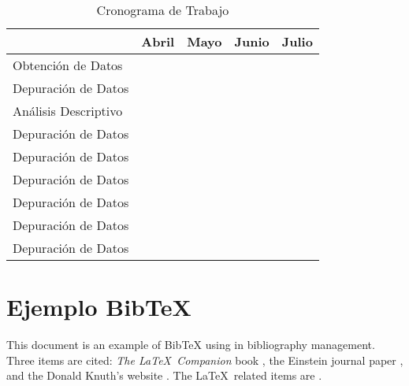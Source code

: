 \documentclass[10pt,a5paper]{article}
\begin{document}
\begin{table}[h!]
\centering
\caption{Cronograma de Trabajo}
\label{cronograma}
\begin{tabular}{|l|c|c|c|c|}
\hline
                     & Abril   & Mayo   & Junio   & Julio  \\ \hline
Obtención de Datos   &   &   &   &    \\ \hline
Depuración de Datos  &   &   &   &    \\ \hline
Análisis Descriptivo &   &   &   &    \\ \hline
Depuración de Datos  &   &   &   &    \\ \hline
Depuración de Datos  &   &   &   &    \\ \hline
Depuración de Datos  &   &   &   &    \\ \hline
Depuración de Datos  &   &   &   &    \\ \hline
Depuración de Datos  &   &   &   &    \\ \hline
Depuración de Datos  &   &   &   &    \\ \hline

\hline
\end{tabular}
\end{table}

\section{Ejemplo BibTeX}
This document is an example of BibTeX using in bibliography management. Three items are cited: \textit{The \LaTeX\ Companion} book \cite{latexcompanion}, the Einstein journal paper \cite{einstein}, and the Donald Knuth's website \cite{knuthwebsite}. The \LaTeX\ related items are \cite{latexcompanion,knuthwebsite}. 



\end{document}
